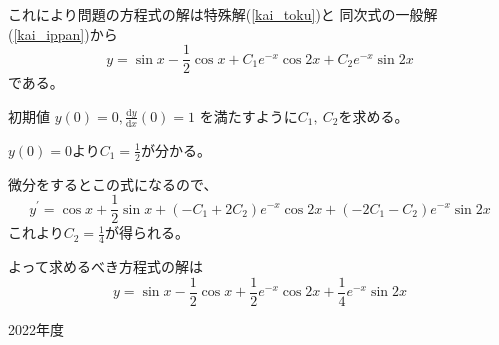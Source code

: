 \documentclass[12pt,b5paper]{ltjsarticle}
\begin{document}
\begin{enumerate}
      これにより問題の方程式の解は特殊解(\ref{kai_toku})と
      同次式の一般解(\ref{kai_ippan})から
      \begin{equation}
       y=\sin x -\frac{1}{2}\cos x
        + C_{1}e^{-x}\cos 2x + C_{2}e^{-x}\sin 2x
      \end{equation}
      である。

      初期値
      $y(0)=0, \frac{\mathrm{d}y}{\mathrm{d}x}(0)=1$
      を満たすように$C_{1},\ C_{2}$を求める。

      $y(0)=0$より$C_{1}=\frac{1}{2}$が分かる。

      微分をするとこの式になるので、
      \begin{equation}
       y^{\prime}=\cos x + \frac{1}{2}\sin x
        + (-C_{1}+2C_{2})e^{-x}\cos 2x + (-2C_{1}-C_{2})e^{-x}\sin 2x
      \end{equation}
      これより$C_{2}=\frac{1}{4}$が得られる。

      よって求めるべき方程式の解は
      \begin{equation}
       y=\sin x -\frac{1}{2}\cos x
        + \frac{1}{2}e^{-x}\cos 2x + \frac{1}{4}e^{-x}\sin 2x
      \end{equation}


\end{enumerate}


\newpage
\hrulefill
2022年度
\hrulefill
\end{document}
